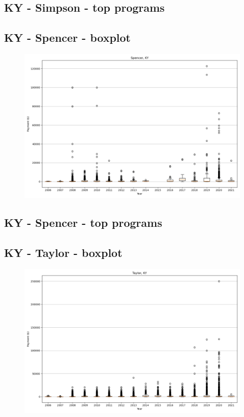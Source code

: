 \subsection*{KY - Simpson - top programs}

\newpage
\subsection*{KY - Spencer - boxplot}
\begin{figure}[h]
\centering
\includegraphics[width=7in]{../output/boxplots/counties/Spencer-KY_boxplot.png}
\end{figure}


\subsection*{KY - Spencer - top programs}

\newpage
\subsection*{KY - Taylor - boxplot}
\begin{figure}[h]
\centering
\includegraphics[width=7in]{../output/boxplots/counties/Taylor-KY_boxplot.png}
\end{figure}


